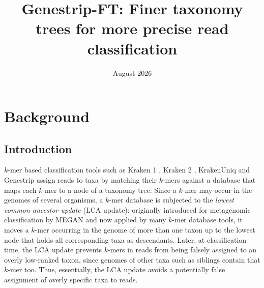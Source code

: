 \documentclass[pdflatex,sn-vancouver-num]{sn-jnl}
\begin{document}
    \title{Genestrip-FT: Finer taxonomy trees for more precise read classification}

    \author*[1]{ }

    \author*[1]{ }
    
    \author*[1]{ }
    

    \date{August 2026}




    \maketitle

    \section{Background}\label{background}

    \subsection{Introduction}
\label{problem}

$k$-mer based classification tools such as Kraken 1 \citep{kraken}, Kraken 2 \citep{kraken2}, KrakenUniq \citep{krakenUniq} and Genestrip \citep{genestrip-pub} assign reads to taxa by matching their $k$-mers against a database that maps each $k$-mer to a node of a taxonomy tree. Since a $k$-mer may occur in the genomes of several organisms, a $k$-mer database is subjected to the \emph{lowest common ancestor update} (LCA update): originally introduced for metagenomic classification by MEGAN \citep{megan} and now applied by many $k$-mer database tools, it moves a $k$-mer occurring in the genome of more than one taxon up to the lowest node that holds all corresponding taxa as descendants. Later, at classification time, the LCA update prevents $k$-mers in reads from being falsely assigned to an overly low-ranked taxon, since genomes of other taxa such as siblings contain that $k$-mer too. Thus, essentially, the LCA update avoids a potentially false assignment of overly specific taxa to reads.
\end{document}
